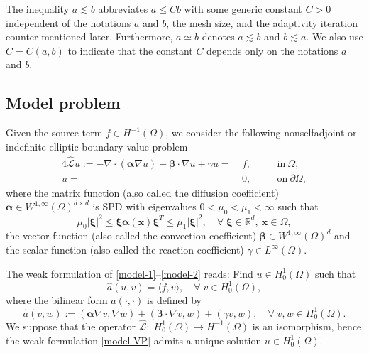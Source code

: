 \documentclass[preprint,times]{elsarticle}%
\numberwithin{algorithm}{section}
\numberwithin{equation}{section}
\newcommand{\vect}[1]{\boldsymbol{#1}}
\newcommand{\vx}{\boldsymbol{x}}
\newcommand{\valpha}{\boldsymbol{\alpha}}
\newcommand{\vbeta}{\boldsymbol{\beta}}
\newcommand{\ha}{\hat{a}}
\newcommand{\hmcL}{\hat{\mathcal{L}}}
\newcommand{\mcL}{\mathcal{L}}
\def\leq{\leqslant}
\begin{document}
The inequality $a\lesssim b$ abbreviates $a\leq Cb$ with some generic constant $C > 0$ independent of the notations $a$ and $b$, the mesh size, and the adaptivity iteration counter mentioned later. Furthermore, $a \simeq b$ denotes $a \lesssim b$ and $b \lesssim a$. We also use $C = C(a,b)$ to indicate that the constant $C$ depends only on the notations $a$ and $b$. 


\subsection{Model problem}
Given the source term $f \in H^{-1}(\Omega)$, we consider the following nonselfadjoint or indefinite elliptic boundary-value problem
\begin{alignat}{4}
	\hat{\mcL}u:=-\nabla \cdot(\boldsymbol{\alpha}\nabla u)+\boldsymbol{\beta} \cdot \nabla u+\gamma u  =~&f,  &\quad&\text{in}~\Omega,  \label{model-1} \\
	u  =~&0,&\quad&\text{on}~ \partial \Omega,\label{model-2} 
\end{alignat}
where the matrix function (also called the diffusion coefficient) $\vect{\alpha} \in W^{1,\infty}(\Omega)^{d\times d}$ is SPD with eigenvalues $0 < \mu_0 < \mu_1 < \infty$ such that
	\begin{equation}\label{ellipticity}
		\mu_0|\boldsymbol{\xi}|^2 \leq \boldsymbol{\xi}\valpha(\vx)\boldsymbol{\xi}^T  \leq \mu_1|\boldsymbol{\xi}|^2, \quad \forall \; \boldsymbol{\xi} \in \mathbb{R}^d, ~ \vx \in \Omega, 
	\end{equation}
the vector function (also called the convection coefficient) $\vect{\beta} \in W^{1,\infty}(\Omega)^d$ and the scalar function (also called the reaction coefficient) $\gamma \in L^\infty(\Omega)$. 

The weak formulation of \eqref{model-1}--\eqref{model-2} reads: Find $u \in H_0^1(\Omega)$ such that 
\begin{equation}\label{model-VP}
	\ha(u,v) = \langle f , v \rangle, \quad \forall\; v \in H_0^1(\Omega), 
\end{equation}
where the bilinear form $\ha(\cdot,\cdot)$ is defined by 
\begin{equation}\label{bilinear-ha}
	\ha(v,w) := (\valpha\nabla v,\nabla w) + (\vbeta\cdot \nabla v,w) + (\gamma v,w), \quad
	\forall \; v,w \in H_0^1(\Omega). 
\end{equation}
We suppose that the operator $\hmcL:\; H_0^1(\Omega) \rightarrow H^{-1}(\Omega)$ is an isomorphism, hence the weak formulation \eqref{model-VP} admits a unique solution $u \in H_0^1(\Omega)$.   
\end{document}
